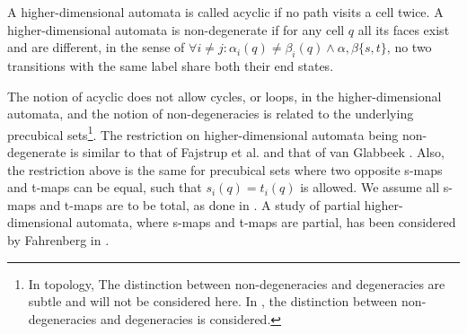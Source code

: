     \begin{definition}
        \label{def:acyclic-and-non-degenerate-higher-dimensional-automata}
        A higher-dimensional automata is called acyclic if no path visits a cell twice. A higher-dimensional automata is non-degenerate if for any cell $q$ all its faces exist and are different, in the sense of $\forall i \neq j : \alpha_i(q) \neq \beta_i(q) \wedge \alpha , \beta \{s,t\}$, no two transitions with the same label share both their end states.
    \end{definition}
    
    The notion of acyclic does not allow cycles, or loops, in the higher-dimensional automata, and the notion of non-degeneracies is related to the underlying precubical sets\footnote{In topology, The distinction between non-degeneracies and degeneracies are subtle and will not be considered here. In \cite{Goubault95PhDThesis}, the  distinction between non-degeneracies and degeneracies is considered.}. The restriction on higher-dimensional automata being non-degenerate is similar to that of Fajstrup et al. \cite{Fajstrup16DirectedAlgebraicTopologyConcurrency} and that of van Glabbeek \cite{Glabbeek06HDA}. Also, the restriction above is the same for precubical sets where two opposite s-maps and t-maps can be equal, such that $s_i(q) = t_i(q)$ is allowed. We assume all s-maps and t-maps are to be total, as done in \cite{Johansen16STstruct}. A study of partial higher-dimensional automata, where s-maps and t-maps are partial, has been considered by Fahrenberg in \cite{Fahrenberg15PartialHDA}.